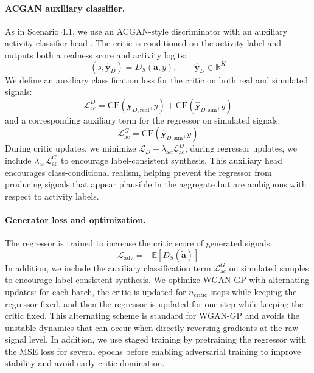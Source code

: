 \paragraph{ACGAN auxiliary classifier.}
As in Scenario 4.1, we use an ACGAN-style discriminator with an auxiliary activity classifier head \cite{odena2017conditional}. The critic is conditioned on the activity label and outputs both a realness score and activity logits:
\begin{equation}
    (s, \hat{\mathbf{y}}_{D}) = D_S(\mathbf{a}, y), \qquad \hat{\mathbf{y}}_{D} \in \mathbb{R}^{K}
\end{equation}
We define an auxiliary classification loss for the critic on both real and simulated signals:
\begin{equation}
    \mathcal{L}_{\text{ac}}^{D} =
    \text{CE}(\hat{\mathbf{y}}_{D,\text{real}}, y)
    + \text{CE}(\hat{\mathbf{y}}_{D,\text{sim}}, y)
\end{equation}
and a corresponding auxiliary term for the regressor on simulated signals:
\begin{equation}
    \mathcal{L}_{\text{ac}}^{G} = \text{CE}(\hat{\mathbf{y}}_{D,\text{sim}}, y)
\end{equation}
During critic updates, we minimize $\mathcal{L}_D + \lambda_{\text{ac}}\mathcal{L}_{\text{ac}}^{D}$; during regressor updates, we include $\lambda_{\text{ac}}\mathcal{L}_{\text{ac}}^{G}$ to encourage label-consistent synthesis. This auxiliary head encourages class-conditional realism, helping prevent the regressor from producing signals that appear plausible in the aggregate but are ambiguous with respect to activity labels.

\paragraph{Generator loss and optimization.}
The regressor is trained to increase the critic score of generated signals:
\begin{equation}
    \mathcal{L}_{\text{adv}} = -\mathbb{E}[D_S(\tilde{\mathbf{a}})]
\end{equation}
In addition, we include the auxiliary classification term $\mathcal{L}_{\text{ac}}^{G}$ on simulated samples to encourage label-consistent synthesis. We optimize WGAN-GP with alternating updates: for each batch, the critic is updated for $n_{\text{critic}}$ steps while keeping the regressor fixed, and then the regressor is updated for one step while keeping the critic fixed. This alternating scheme is standard for WGAN-GP and avoids the unstable dynamics that can occur when directly reversing gradients at the raw-signal level. In addition, we use staged training by pretraining the regressor with the MSE loss for several epochs before enabling adversarial training to improve stability and avoid early critic domination.

